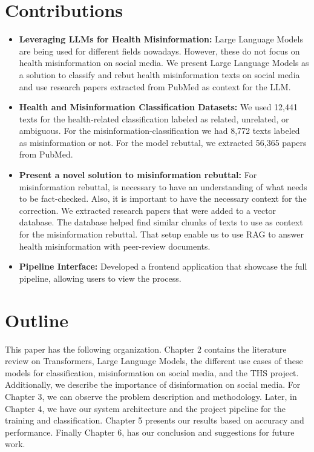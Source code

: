 \section{Contributions}
\noindent
\begin{itemize}
	\item \textbf{Leveraging LLMs for Health Misinformation:} Large Language Models are being used for different fields nowadays. However, these do not focus on health misinformation on social media. We present Large Language Models as a solution
	to classify and rebut health misinformation texts on social media and use research papers extracted from PubMed as context for the LLM.
	\item \textbf{Health and Misinformation Classification Datasets:} We used 12,441 texts for the health-related classification labeled as related, unrelated, or ambiguous. For the misinformation-classification we had 8,772 texts labeled as misinformation or not. For the model rebuttal, we extracted
	56,365 papers from PubMed.
	\item \textbf{Present a novel solution to misinformation rebuttal:} For misinformation rebuttal, is necessary to have an understanding of what needs to be fact-checked. Also, it is important to have the necessary context for the correction. We extracted research papers that were added to a
	vector database. The database helped find similar chunks of texts to use as context for the misinformation rebuttal. That setup enable us to use RAG to answer health misinformation with peer-review documents.
	\item \textbf{Pipeline Interface:} Developed a frontend application that showcase the full pipeline, allowing users to view the process.
	
\end{itemize}

\section{Outline}
\noindent
This paper has the following organization. Chapter 2 contains the literature review on Transformers, Large Language Models,
the different use cases of these models for classification, misinformation on social media, and the THS project. Additionally, we describe the
importance of disinformation on social media. For Chapter 3, we can observe the problem description and methodology.
 Later, in Chapter 4, we have our system architecture and the project pipeline for the training and classification. Chapter 5 presents our results based on accuracy and performance. Finally Chapter 6, has our conclusion and suggestions for future work.
 
 
 
 
 